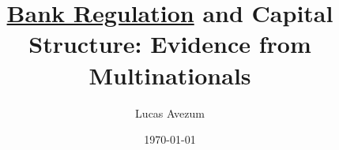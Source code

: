 \documentclass[12pt]{article}
\begin{document}
	
		\title{\underline{Bank Regulation} and Capital Structure: Evidence from Multinationals}
		\author{Lucas Avezum}
		\date{\today}
		\maketitle
			
	
	
	
	
	\doublespacing
	


	 
\end{document}
